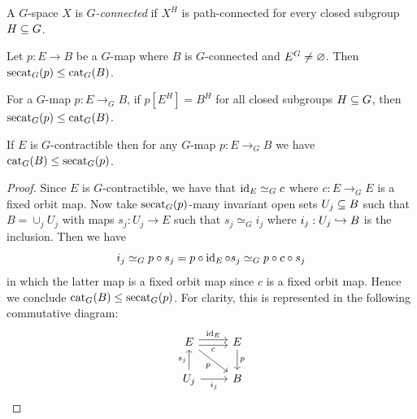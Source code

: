 \begin{definition}
    A $G$-space $X$ is \emph{$G$-connected} if $X^H$ is path-connected for every closed subgroup $H \subseteq G$.
\end{definition}

\begin{proposition}\label{prop:connected-secat-leq-cat}
    Let $p : E \to B$ be a $G$-map where $B$ is $G$-connected and $E^G \neq \varnothing$.
    Then $\operatorname{secat}_G(p) \leq \operatorname{cat}_G(B)$.
\end{proposition}

\begin{proposition}\label{prop:subgroups-secat-leq-cat}
    For a $G$-map $p : E \to_G B$, if $p[E^H] = B^H$ for all closed subgroups $H \subseteq G$, then $\operatorname{secat}_G(p) \leq \operatorname{cat}_G(B)$.
\end{proposition}

\begin{proposition}\label{prop:contractible-cat-leq-secat}
    If $E$ is $G$-contractible then for any $G$-map $p : E \to_G B$ we have $\operatorname{cat}_G(B) \leq \operatorname{secat}_G(p)$.
    \begin{proof}
        Since $E$ is $G$-contractible, we have that $\operatorname{id}_E \simeq_G c$ where $c : E \to_G E$ is a fixed orbit map.
        Now take $\operatorname{secat}_G(p)$-many invariant open sets $U_j \subseteq B$ such that $B = \cup_j U_j$ with maps $s_j : U_j \to E$ such that $s_j \simeq_G i_j$ where $i_j : U_j \hookrightarrow B$ is the inclusion.
        Then we have
        \[
            i_j
            \simeq_G p \circ s_j
            = p \circ \operatorname{id}_E \circ s_j
            \simeq_G p \circ c \circ s_j
        \]
        in which the latter map is a fixed orbit map since $c$ is a fixed orbit map.
        Hence we conclude $\operatorname{cat}_G(B) \leq \operatorname{secat}_G(p)$.
        For clarity, this is represented in the following commutative diagram:
        \[\begin{tikzcd}
        	E & E \\
        	{U_j} & B
        	\arrow["c"', shift right, from=1-1, to=1-2]
        	\arrow["{\id_E}", shift left, from=1-1, to=1-2]
        	\arrow["p"', from=1-1, to=2-2]
        	\arrow["p", from=1-2, to=2-2]
        	\arrow["{s_j}", from=2-1, to=1-1]
        	\arrow["{i_j}"', from=2-1, to=2-2]
        \end{tikzcd}\]
    \end{proof}
\end{proposition}


